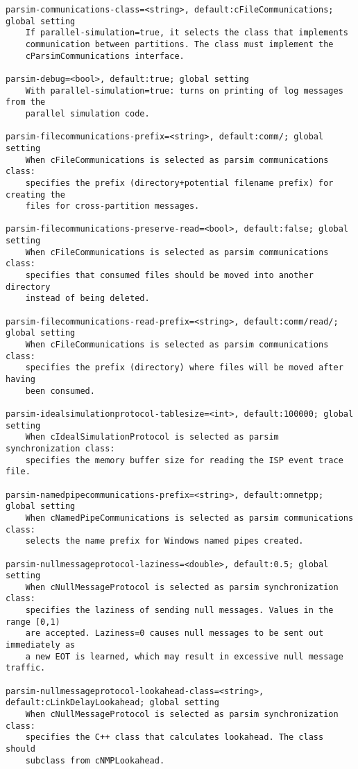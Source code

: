 \begin{verbatim}
parsim-communications-class=<string>, default:cFileCommunications; global setting
    If parallel-simulation=true, it selects the class that implements
    communication between partitions. The class must implement the
    cParsimCommunications interface.

parsim-debug=<bool>, default:true; global setting
    With parallel-simulation=true: turns on printing of log messages from the
    parallel simulation code.

parsim-filecommunications-prefix=<string>, default:comm/; global setting
    When cFileCommunications is selected as parsim communications class:
    specifies the prefix (directory+potential filename prefix) for creating the
    files for cross-partition messages.

parsim-filecommunications-preserve-read=<bool>, default:false; global setting
    When cFileCommunications is selected as parsim communications class:
    specifies that consumed files should be moved into another directory
    instead of being deleted.

parsim-filecommunications-read-prefix=<string>, default:comm/read/; global setting
    When cFileCommunications is selected as parsim communications class:
    specifies the prefix (directory) where files will be moved after having
    been consumed.

parsim-idealsimulationprotocol-tablesize=<int>, default:100000; global setting
    When cIdealSimulationProtocol is selected as parsim synchronization class:
    specifies the memory buffer size for reading the ISP event trace file.

parsim-namedpipecommunications-prefix=<string>, default:omnetpp; global setting
    When cNamedPipeCommunications is selected as parsim communications class:
    selects the name prefix for Windows named pipes created.

parsim-nullmessageprotocol-laziness=<double>, default:0.5; global setting
    When cNullMessageProtocol is selected as parsim synchronization class:
    specifies the laziness of sending null messages. Values in the range [0,1)
    are accepted. Laziness=0 causes null messages to be sent out immediately as
    a new EOT is learned, which may result in excessive null message traffic.

parsim-nullmessageprotocol-lookahead-class=<string>, default:cLinkDelayLookahead; global setting
    When cNullMessageProtocol is selected as parsim synchronization class:
    specifies the C++ class that calculates lookahead. The class should
    subclass from cNMPLookahead.


\end{verbatim}
